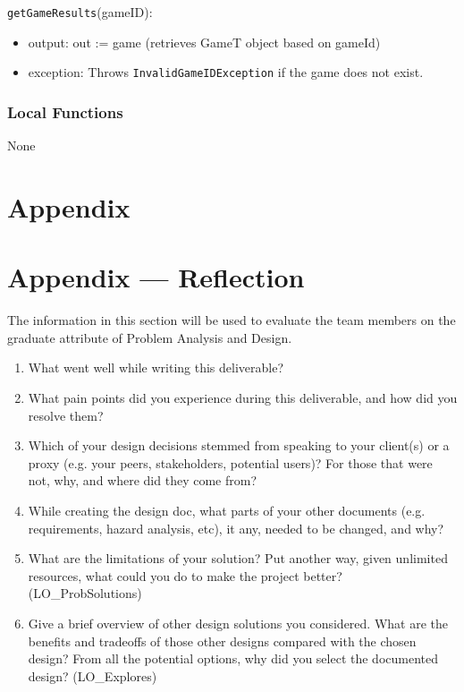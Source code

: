 \documentclass[12pt, titlepage]{article}
\begin{document}
\noindent \texttt{getGameResults}(gameID):
\begin{itemize}
  \item output: out := game (retrieves GameT object based on gameId)
  \item exception: Throws \texttt{InvalidGameIDException} if the game does not exist.
\end{itemize}

\subsubsection{Local Functions}

None


\newpage

\section{Appendix} \label{Appendix}


\newpage{}

\section*{Appendix --- Reflection}


The information in this section will be used to evaluate the team members on the
graduate attribute of Problem Analysis and Design.



\begin{enumerate}
  \item What went well while writing this deliverable?
  \item What pain points did you experience during this deliverable, and how
        did you resolve them?
  \item Which of your design decisions stemmed from speaking to your client(s)
        or a proxy (e.g. your peers, stakeholders, potential users)? For those that
        were not, why, and where did they come from?
  \item While creating the design doc, what parts of your other documents (e.g.
        requirements, hazard analysis, etc), it any, needed to be changed, and why?
  \item What are the limitations of your solution?  Put another way, given
        unlimited resources, what could you do to make the project better? (LO\_ProbSolutions)
  \item Give a brief overview of other design solutions you considered.  What
        are the benefits and tradeoffs of those other designs compared with the chosen
        design?  From all the potential options, why did you select the documented design?
        (LO\_Explores)
\end{enumerate}
\end{document}
